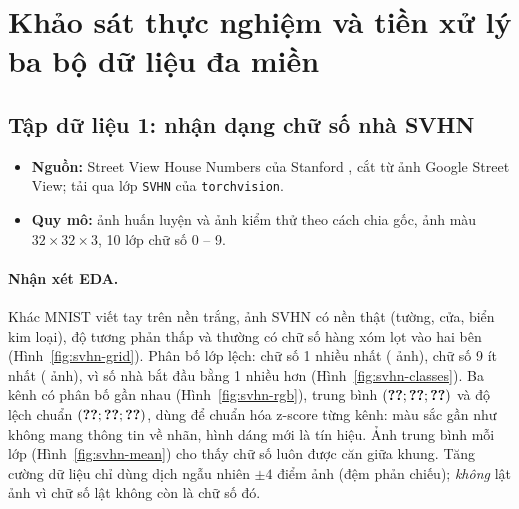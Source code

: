 
\section{Khảo sát thực nghiệm và tiền xử lý ba bộ dữ liệu đa miền}

\subsection{Tập dữ liệu 1: nhận dạng chữ số nhà SVHN}

\begin{itemize}
  \item \textbf{Nguồn:} Street View House Numbers của Stanford \cite{netzer2011}, cắt từ ảnh Google Street View; tải qua
    lớp \texttt{SVHN} của \texttt{torchvision}.
  \item \textbf{Quy mô:}  ảnh huấn luyện và  ảnh kiểm thử theo cách chia gốc, ảnh
    màu $32{\times}32{\times}3$, 10 lớp chữ số 0 -- 9.
\end{itemize}


\paragraph{Nhận xét EDA.} Khác MNIST viết tay trên nền trắng, ảnh SVHN có nền thật (tường, cửa, biển kim loại), độ tương
phản thấp và thường có chữ số hàng xóm lọt vào hai bên (Hình~\ref{fig:svhn-grid}). Phân bố lớp lệch: chữ số 1 nhiều nhất
( ảnh), chữ số 9 ít nhất ( ảnh), vì số nhà bắt đầu bằng 1 nhiều hơn
(Hình~\ref{fig:svhn-classes}). Ba kênh có phân bố gần nhau (Hình~\ref{fig:svhn-rgb}), trung bình
$(\SL{eda/svhn/mean/0}; \SL{eda/svhn/mean/1}; \SL{eda/svhn/mean/2})$ và độ lệch chuẩn
$(\SL{eda/svhn/std/0}; \SL{eda/svhn/std/1}; \SL{eda/svhn/std/2})$, dùng để chuẩn hóa z-score từng kênh: màu sắc gần như
không mang thông tin về nhãn, hình dáng mới là tín hiệu. Ảnh trung bình mỗi lớp (Hình~\ref{fig:svhn-mean}) cho thấy chữ số
luôn được căn giữa khung. Tăng cường dữ liệu chỉ dùng dịch ngẫu nhiên $\pm 4$ điểm ảnh (đệm phản chiếu); \emph{không} lật
ảnh vì chữ số lật không còn là chữ số đó.

